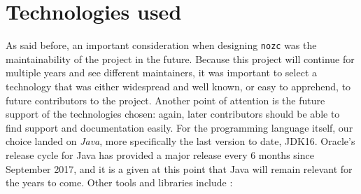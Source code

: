 \section{Technologies used}\label{sec:ch3-technologies}
As said before, an important consideration when designing \texttt{nozc} was the maintainability of the project in the future.
Because this project will continue for multiple years and see different maintainers, it was important to select a technology that was either widespread and well known, or easy to apprehend, to future contributors to the project.
Another point of attention is the future support of the technologies chosen: again, later contributors should be able to find support and documentation easily.
For the programming language itself, our choice landed on \textit{Java}, more specifically the last version to date, JDK16.
Oracle's release cycle for Java has provided a major release every 6 months since September 2017, and it is a given at this point that Java will remain relevant for the years to come.\newline
Other tools and libraries include :

